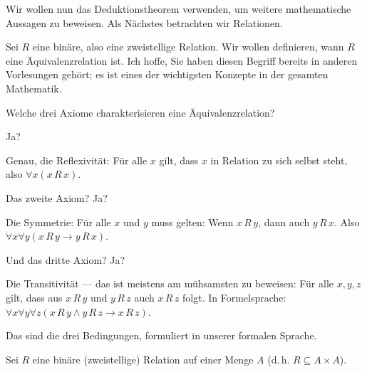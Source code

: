 \begin{spoken-clean}[00:52:49 - 00:55:04]
Wir wollen nun das Deduktionstheorem verwenden, um weitere mathematische Aussagen zu beweisen. Als Nächstes betrachten wir Relationen. 

Sei $R$ eine binäre, also eine zweistellige Relation. Wir wollen definieren, wann $R$ eine Äquivalenzrelation ist. Ich hoffe, Sie haben diesen Begriff bereits in anderen Vorlesungen gehört; es ist eines der wichtigsten Konzepte in der gesamten Mathematik. 

Welche drei Axiome charakterisieren eine Äquivalenzrelation? 

Ja? 

Genau, die Reflexivität: Für alle $x$ gilt, dass $x$ in Relation zu sich selbst steht, also $\forall x (x \, R \, x)$. 

Das zweite Axiom? Ja? 

Die Symmetrie: Für alle $x$ und $y$ muss gelten: Wenn $x \, R \, y$, dann auch $y \, R \, x$. Also $\forall x \forall y (x \, R \, y \rightarrow y \, R \, x)$. 

Und das dritte Axiom? Ja? 

Die Transitivität --- das ist meistens am mühsamsten zu beweisen: Für alle $x, y, z$ gilt, dass aus $x \, R \, y$ und $y \, R \, z$ auch $x \, R \, z$ folgt. In Formelsprache: $\forall x \forall y \forall z (x \, R \, y \wedge y \, R \, z \rightarrow x \, R \, z)$. 

Das sind die drei Bedingungen, formuliert in unserer formalen Sprache.
\end{spoken-clean}

\begin{math-stroke}[Äquivalenzrelationen]
Sei $R$ eine binäre (zweistellige) Relation auf einer Menge $A$ (d.\,h. $R \subseteq A \times A$).

\end{math-stroke}

